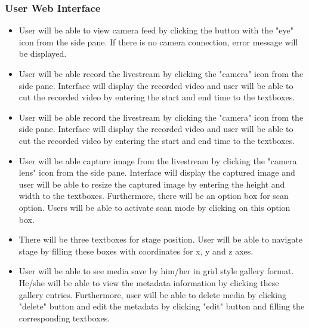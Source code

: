 \subsubsection{User Web Interface}
\begin{itemize}
	\item User will be able to view camera feed by clicking the button with the "eye" icon from the side pane. If there is no camera connection, error message will be displayed.
	\item User will be able record the livestream by clicking the "camera" icon from the side pane. Interface will display the recorded video and user will be able to cut the recorded video by entering the start and end time to the textboxes.
	\item User will be able record the livestream by clicking the "camera" icon from the side pane. Interface will display the recorded video and user will be able to cut the recorded video by entering the start and end time to the textboxes.
	\item User will be able capture image from the livestream by clicking the "camera lens" icon from the side pane. Interface will display the captured image and user will be able to resize the captured image by entering the height and width to the textboxes. Furthermore, there will be an option box for scan option. Users will be able to activate scan mode by clicking on this option box.
	\item There will be three textboxes for stage position. User will be able to navigate stage by filling these boxes with coordinates for x, y and z axes.
	\item User will be able to see media save by him/her in grid style gallery format. He/she will be able to view the metadata information by clicking these gallery entries. Furthermore, user will be able to delete media by clicking "delete" button and edit the metadata by clicking "edit" button and filling the corresponding textboxes.
\end{itemize}

